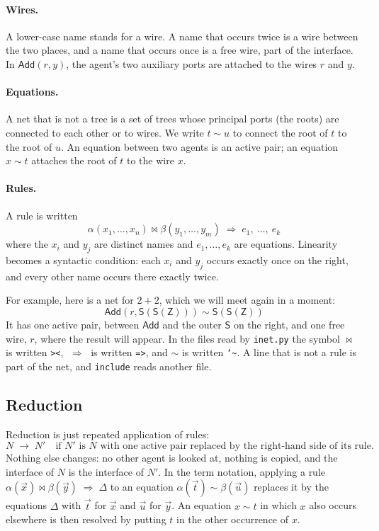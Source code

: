 \documentclass[11pt,a4paper]{article}
\newcommand{\ag}[1]{\mathsf{#1}}
\newcommand{\Z}{\ag{Z}}
\newcommand{\Sa}{\ag{S}}
\newcommand{\Add}{\ag{Add}}
\newcommand{\act}{\mathrel{\bowtie}}
\newcommand{\eqn}{\mathrel{\sim}}
\newcommand{\rul}{\;\Rightarrow\;}
\newcommand{\red}{\;\to\;}
\theoremstyle{definition}
\theoremstyle{plain}
\begin{document}
\paragraph{Wires.} A lower-case name stands for a wire. A name that occurs
twice is a wire between the two places, and a name that occurs once is a free
wire, part of the interface. In $\Add(r, y)$, the agent's two auxiliary ports
are attached to the wires $r$ and $y$.

\paragraph{Equations.} A net that is not a tree is a set of trees whose
principal ports (the roots) are connected to each other or to wires. We write
$t \eqn u$ to connect the root of $t$ to the root of $u$. An equation between
two agents is an active pair; an equation $x \eqn t$ attaches the root of $t$
to the wire $x$.

\paragraph{Rules.} A rule is written
\[
  \alpha(x_1,\dots,x_n) \act \beta(y_1,\dots,y_m) \rul e_1,\ \dots,\ e_k
\]
where the $x_i$ and $y_j$ are distinct names and $e_1,\dots,e_k$ are
equations. Linearity becomes a syntactic condition: each $x_i$ and $y_j$
occurs exactly once on the right, and every other name occurs there exactly
twice.

\medskip\noindent
For example, here is a net for $2+2$, which we will meet again in a moment:
\[
  \Add(r, \Sa(\Sa(\Z))) \eqn \Sa(\Sa(\Z))
\]
It has one active pair, between $\Add$ and the outer $\Sa$ on the right, and
one free wire, $r$, where the result will appear. In the files read by
\texttt{inet.py} the symbol $\act$ is written \texttt{><}, $\rul$ is written
\texttt{=>}, and $\eqn$ is written \texttt{\char`\~}. A line that is not a
rule is part of the net, and \texttt{include} reads another file.

\subsection{Reduction}

Reduction is just repeated application of rules:
\[
  N \red N' \quad\text{if $N'$ is $N$ with one active pair replaced by the
  right-hand side of its rule.}
\]
Nothing else changes: no other agent is looked at, nothing is copied, and the
interface of $N$ is the interface of $N'$. In the term notation, applying a
rule $\alpha(\vec x) \act \beta(\vec y) \rul \Delta$ to an equation
$\alpha(\vec t) \eqn \beta(\vec u)$ replaces it by the equations $\Delta$
with $\vec t$ for $\vec x$ and $\vec u$ for $\vec y$. An equation $x \eqn t$
in which $x$ also occurs elsewhere is then resolved by putting $t$ in the
other occurrence of $x$.
\end{document}
